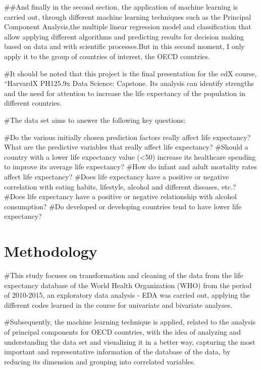 \documentclass[
]{article}
\begin{document}
\#\#And finally in the second section, the application of machine
learning is carried out, through different machine learning techniques
such as the Principal Component Analysis,the multiple linear regression
model and classification that allow applying different algorithms and
predicting results for decision making based on data and with scientific
processes.But in this second moment, I only apply it to the group of
countries of interest, the OECD countries.

\#It should be noted that this project is the final presentation for the
edX course, ``HarvardX PH125.9x Data Science: Capstone. Its analysis can
identify strengths and the need for attention to increase the life
expectancy of the population in different countries.

\#The data set aims to answer the following key questions:

\#Do the various initially chosen prediction factors really affect life
expectancy? What are the predictive variables that really affect life
expectancy? \#Should a country with a lower life expectancy value
(\textless50) increase its healthcare spending to improve its average
life expectancy? \#How do infant and adult mortality rates affect life
expectancy? \#Does life expectancy have a positive or negative
correlation with eating habits, lifestyle, alcohol and different
diseases, etc.? \#Does life expectancy have a positive or negative
relationship with alcohol consumption? \#Do developed or developing
countries tend to have lower life expectancy?

\section{Methodology}\label{methodology}

\#This study focuses on transformation and cleaning of the data from the
life expectancy database of the World Health Organization (WHO) from the
period of 2010-2015, an exploratory data analysis - EDA was carried out,
applying the different codes learned in the course for univariate and
bivariate analyses.

\#Subsequently, the machine learning technique is applied, related to
the analysis of principal components for OECD countries, with the idea
of analyzing and understanding the data set and visualizing it in a
better way, capturing the most important and representative information
of the database of the data, by reducing its dimension and grouping into
correlated variables.
\end{document}

